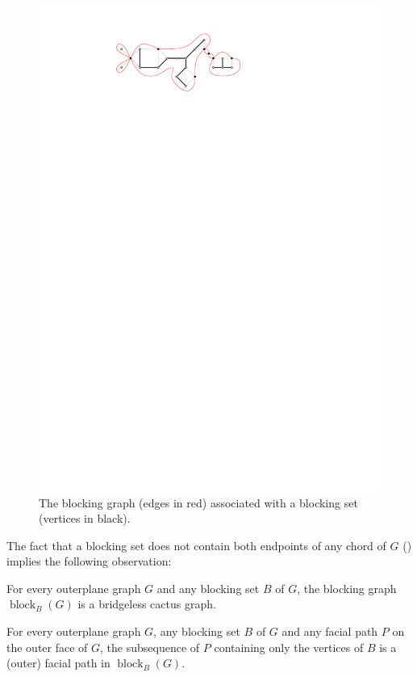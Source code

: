 \documentclass{patmorin}
\DeclareMathOperator{\block}{block}
\begin{document}
\begin{figure}
  \begin{center}
     \includegraphics{figs/blocking-set-2}
  \end{center}
  \caption{The blocking graph (edges in red) associated with a blocking set (vertices in black).}
\end{figure}

The fact that a blocking set does not contain both endpoints of any
chord of $G$ () implies the following observation:

\begin{obs}
   For every outerplane graph $G$ and any blocking set $B$ of $G$,
   the blocking graph $\block_B(G)$ is a bridgeless cactus graph.
\end{obs}

\begin{obs}
For every outerplane graph $G$, any blocking set $B$ of $G$ and any
facial path $P$ on the outer face of  $G$, the subsequence of $P$
containing only the vertices of $B$ is a (outer) facial path in $\block_B(G)$.
\end{obs}
\end{document}
